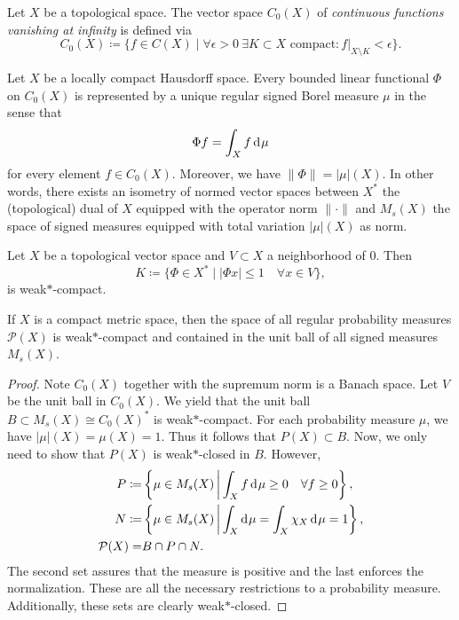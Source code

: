 \begin{defin}
  \label{def:vanishing}
  Let \(X\) be a topological space. The vector space \(C_0(X)\) of \emph{continuous functions vanishing at infinity} is defined via
  \[
    C_0(X) \coloneqq \{f \in C(X) \mid \forall \epsilon > 0\ \exists K \subset X \text{ compact}\colon f|_{X\setminus K} < \epsilon\}.
  \]
\end{defin}

\begin{thm}
  \label{thm:riesz-markow}
  Let \(X\) be a locally compact Hausdorff space. Every bounded linear functional \(\Phi\) on \(C_0(X)\) is represented by a unique regular signed Borel measure \(\mu\) in the sense that \[
    \Phi f = \int_X f \d\mu
  \]
  for every element \(f \in C_0(X)\). Moreover, we have \(\|\Phi\| = |\mu|(X)\). In other words, there exists an isometry of normed vector spaces between \(X^\ast\) the (topological) dual of \(X\) equipped with the operator norm \(\|\cdot \|\) and \(M_{s}(X)\) the space of signed measures equipped with total variation \(|\mu|(X)\) as norm.
\end{thm}

\begin{thm}
  Let \(X\) be a topological vector space and \(V \subset X\) a neighborhood of \(0\). Then
  \[
    K \coloneqq \{ \Phi \in X^\ast \mid |\Phi x| \leq 1 \quad \forall x \in V\},
  \]
  is weak\(\ast\)-compact.
\end{thm}

\begin{cor}
  \label{cor:banach-alaoglu}
  If \(X\) is a compact metric space, then the space of all regular probability measures \(\mathcal{P}(X)\) is weak\(\ast\)-compact and contained in the unit ball of all signed measures \(M_{s}(X)\).
\end{cor}

\begin{proof}
  Note \(C_0(X)\) together with the supremum norm is a Banach space. Let \(V\) be the unit ball in \(C_0(X)\). We yield that the unit ball \(B \subset M_s(X) \cong C_0(X)^\ast\) is weak\(\ast\)-compact. For each probability measure \(\mu\), we have \(|\mu|(X) = \mu(X) = 1\). Thus it follows that \(P(X) \subset B\). Now, we only need to show that \(P(X)\) is weak\(\ast\)-closed in \(B\). However,
  \begin{align*}
    P \coloneqq & \left\{\mu \in M_s(X) \relmid \int_X f \d\mu \geq 0 \quad \forall f \geq 0\right\},\\
    N \coloneqq & \left\{\mu \in M_s(X) \relmid \int_X \d\mu = \int_X \chi_X \d\mu = 1\right\},\\
    \mathcal{P}(X)  = & B \cap P \cap N.
  \end{align*}
  The second set assures that the measure is positive and the last enforces the normalization. These are all the necessary restrictions to a probability measure. Additionally, these sets are clearly weak\(\ast\)-closed.
\end{proof}

